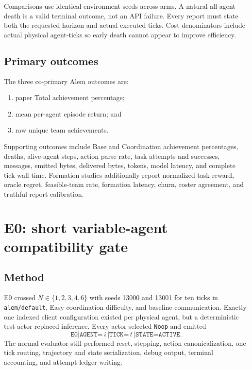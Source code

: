 \documentclass[11pt]{article}
\newcommand{\code}[1]{\texttt{#1}}
\begin{document}
Comparisons use identical environment seeds across arms.  A natural all-agent
death is a valid terminal outcome, not an API failure.  Every report must state
both the requested horizon and actual executed ticks.  Cost denominators include
actual physical agent-ticks so early death cannot appear to improve efficiency.

\subsection{Primary outcomes}

The three co-primary Alem outcomes are:

\begin{enumerate}
  \item paper Total achievement percentage;
  \item mean per-agent episode return; and
  \item raw unique team achievements.
\end{enumerate}

Supporting outcomes include Base and Coordination achievement percentages,
deaths, alive-agent steps, action parse rate, task attempts and successes,
messages, emitted bytes, delivered bytes, tokens, model latency, and complete
tick wall time.  Formation studies additionally report normalized task reward,
oracle regret, feasible-team rate, formation latency, churn, roster agreement,
and truthful-report calibration.

\section{E0: short variable-agent compatibility gate}

\subsection{Method}

E0 crossed $N\in\{1,2,3,4,6\}$ with seeds 13000 and 13001 for ten ticks in
\code{alem/default}, Easy coordination difficulty, and baseline communication.
Exactly one indexed client configuration existed per physical agent, but a
deterministic test actor replaced inference.  Every actor selected
\code{Noop} and emitted
\[
\code{E0|AGENT=}\,i\,\code{|TICK=}\,t\,\code{|STATE=ACTIVE}.
\]
The normal evaluator still performed reset, stepping, action canonicalization,
one-tick routing, trajectory and state serialization, debug output, terminal
accounting, and attempt-ledger writing.
\end{document}
